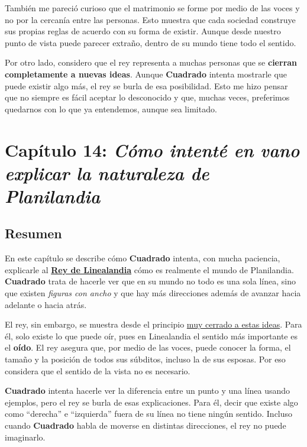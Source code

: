 \documentclass{article}
\begin{document}
También me pareció curioso que el matrimonio se forme por medio de las voces y no por la cercanía entre las personas. Esto muestra que cada sociedad construye sus propias reglas de acuerdo con su forma de existir. Aunque desde nuestro punto de vista puede parecer extraño, dentro de su mundo tiene todo el sentido.

Por otro lado, considero que el rey representa a muchas personas que se \textbf{cierran completamente a nuevas ideas}. Aunque \textbf{Cuadrado} intenta mostrarle que puede existir algo más, el rey se burla de esa posibilidad. Esto me hizo pensar que no siempre es fácil aceptar lo desconocido y que, muchas veces, preferimos quedarnos con lo que ya entendemos, aunque sea limitado.


\section*{\textcolor{Apple Green}{Capítulo 14: \emph{Cómo intenté en vano explicar la naturaleza de Planilandia}}}

\subsection*{Resumen}

En este capítulo se describe cómo \textbf{Cuadrado} intenta, con mucha paciencia, explicarle al \underline{\textbf{Rey de Linealandia}} cómo es realmente el mundo de Planilandia. \textbf{Cuadrado} trata de hacerle ver que en su mundo no todo es una sola línea, sino que existen \emph{figuras con ancho} y que hay más direcciones además de avanzar hacia adelante o hacia atrás.

El rey, sin embargo, se muestra desde el principio \underline{muy cerrado a estas ideas}. Para él, solo existe lo que puede oír, pues en Linealandia el sentido más importante es el \textbf{oído}. El rey asegura que, por medio de las voces, puede conocer la forma, el tamaño y la posición de todos sus súbditos, incluso la de sus esposas. Por eso considera que el sentido de la vista no es necesario.

\textbf{Cuadrado} intenta hacerle ver la diferencia entre un punto y una línea usando ejemplos, pero el rey se burla de esas explicaciones. Para él, decir que existe algo como “derecha” e “izquierda” fuera de su línea no tiene ningún sentido. Incluso cuando \textbf{Cuadrado} habla de moverse en distintas direcciones, el rey no puede imaginarlo.
\end{document}
